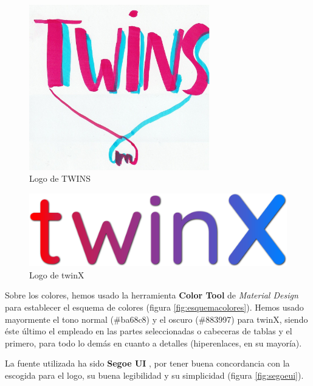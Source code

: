 \begin{figure}
	\centering
	\includegraphics[width=0.7\textwidth, height=0.4\textheight]{img/logotwins}
	\caption{Logo de TWINS}
	\label{fig:logotwins}
\end{figure}

\begin{figure}
	\centering
	\includegraphics[width=\textwidth]{img/logo}
	\caption{Logo de twinX}
	\label{fig:logotwinX}
\end{figure}

Sobre los colores, hemos usado la herramienta \textbf{Color Tool} de \textit{Material Design} para establecer el esquema de colores (figura \ref{fig:esquemacolores}). Hemos usado mayormente el tono normal (\#ba68c8) y el oscuro (\#883997) para twinX, siendo éste último el empleado en las partes seleccionadas o cabeceras de tablas y el primero, para todo lo demás en cuanto a detalles (hiperenlaces, en su mayoría).

La fuente utilizada ha sido \textbf{Segoe UI} \cite{segoeui}, por tener buena concordancia con la escogida para el logo, su buena legibilidad y su simplicidad (figura \ref{fig:segoeui}).

